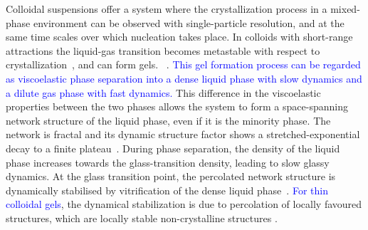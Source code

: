 \documentclass[preprint,amsmath,amssymb,superscriptaddress]{revtex4-1}
\begin{document}
Colloidal suspensions offer a system where the crystallization process in a mixed-phase environment can be observed with single-particle
resolution, and at the same time scales over which nucleation takes place. In colloids with short-range attractions the liquid-gas transition 
becomes metastable with respect to crystallization~\cite{anderson2002insights,lekkerkerker2011colloids}, and can form gels.  
~\cite{poon2002,zaccarelli2007,piazza1994phase,verhaegh1997transient,lu2008gelation}. 
\textcolor{blue}{This gel formation process can be regarded as viscoelastic phase separation  \cite{tanaka1999colloid,tanaka2000viscoelastic} into a dense liquid phase with slow dynamics and a dilute gas phase with fast dynamics.} 
This difference in the viscoelastic properties between the two phases allows the system to form a space-spanning 
network structure of the liquid phase, even if it is the minority phase. The network is fractal and its dynamic structure factor shows a stretched-exponential decay to a finite
plateau~\cite{krall1998internal,solomon2001dynamic,romer2000sol}. 
During phase separation, the density of the liquid phase increases towards the glass-transition density, leading to slow glassy dynamics.
At the glass transition point, the percolated network structure is dynamically stabilised by vitrification 
of the dense liquid phase~\cite{pusey1993dynamics,piazza1994phase,ilett1995phase,verhaegh1997transient,tanaka1999colloid,foffi2002,buzzaccaro2007sticky,zaccarelli2007,lu2008gelation,zaccarelli2008gelation,testard2011}.  
\textcolor{blue}{For thin colloidal gels}, the dynamical stabilization is due to percolation of locally favoured structures, which are locally stable non-crystalline structures \cite{royall2008g}.
\end{document}
